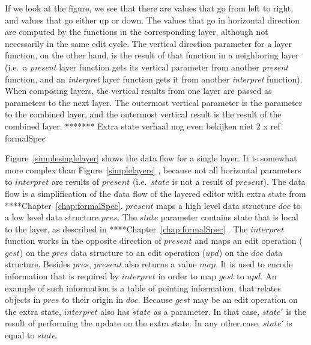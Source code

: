 \documentclass[preprint,natbib]{sigplanconf}
\begin{document}



\bc
If we look at the figure, we see that there are values that go from left to right, and values that go either up or down. The values that go in horizontal direction are computed by the functions in the corresponding layer, although not necessarily in the same edit cycle. The vertical direction parameter for a layer function, on the other hand, is the result of that function in a neighboring layer (i.e.\ a {\em present} layer function gets its vertical parameter from another {\em present} function, and an {\em interpret} layer function gets it from another {\em interpret} function). When composing layers, the vertical results from one layer are passed as parameters to the next layer. The outermost vertical parameter is the parameter to the combined layer, and the outermost vertical result is the result of the combined layer. 
\ec
\bc
******* Extra state verhaal nog even bekijken  niet 2 x ref formalSpec

Figure~\ref{simplesinglelayer} shows the data flow for a single layer. It is somewhat more complex than Figure~\ref{simplelayers} , because not all horizontal parameters to $interpret$ are results of $present$  (i.e.\ $state$ is not a result of $present$). The data flow is a simplification of the data flow of the layered editor with extra state from ****Chapter~\ref{chap:formalSpec}. $present$ maps a high level data structure $doc$ to a low level data structure $pres$. The $state$ parameter contains state that is local to the layer, as described in ****Chapter~\ref{chap:formalSpec} . The $interpret$ function works in the opposite direction of $present$ and maps an edit operation ($gest$) on the $pres$ data structure to an edit operation ($upd$) on the $doc$ data structure. Besides $pres$, $present$ also returns a value $map$. It is used to encode information that is required by $interpret$ in order to map $gest$ to $upd$. An example of such information is a table of pointing information, that relates objects in $pres$ to their origin in $doc$. Because $gest$ may be an edit operation on the extra state, $interpret$ also has $state$ as a parameter. In that case, $state'$ is the result of performing the update on the extra state. In any other case, $state'$ is equal to $state$. 
\ec
\end{document}
